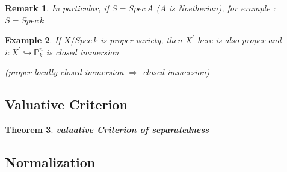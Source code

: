 \documentclass{article}
\newtheorem{theorem}{Theorem}[section]
\newtheorem{example}[theorem]{Example}
\newtheorem{remark}[theorem]{Remark}
\begin{document}
\begin{remark}
    In particular, if $S=Spec\,A$ ($A$ is Noetherian), for example : $S=Spec\,k$
\end{remark}

\begin{example}
    If $X/Spec\,k$ is proper variety, then $X^\prime$ here is also proper and $i:X^\prime\hookrightarrow \mathbb P_k^n$ is closed immersion

    (proper locally closed immersion $\Rightarrow$ closed immersion)
\end{example}







\newpage
\subsection{Valuative Criterion}

\begin{theorem}
\textbf{valuative Criterion of separatedness}
\end{theorem}







\newpage
\subsection{Normalization}






\end{document}

